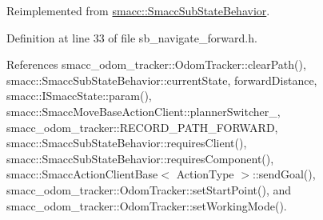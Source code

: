 Reimplemented from \hyperlink{classsmacc_1_1SmaccSubStateBehavior_a7c28e1c46238bbb2c2e0450573c6de94}{smacc\+::\+Smacc\+Sub\+State\+Behavior}.



Definition at line 33 of file sb\+\_\+navigate\+\_\+forward.\+h.



References smacc\+\_\+odom\+\_\+tracker\+::\+Odom\+Tracker\+::clear\+Path(), smacc\+::\+Smacc\+Sub\+State\+Behavior\+::current\+State, forward\+Distance, smacc\+::\+I\+Smacc\+State\+::param(), smacc\+::\+Smacc\+Move\+Base\+Action\+Client\+::planner\+Switcher\+\_\+, smacc\+\_\+odom\+\_\+tracker\+::\+R\+E\+C\+O\+R\+D\+\_\+\+P\+A\+T\+H\+\_\+\+F\+O\+R\+W\+A\+RD, smacc\+::\+Smacc\+Sub\+State\+Behavior\+::requires\+Client(), smacc\+::\+Smacc\+Sub\+State\+Behavior\+::requires\+Component(), smacc\+::\+Smacc\+Action\+Client\+Base$<$ Action\+Type $>$\+::send\+Goal(), smacc\+\_\+odom\+\_\+tracker\+::\+Odom\+Tracker\+::set\+Start\+Point(), and smacc\+\_\+odom\+\_\+tracker\+::\+Odom\+Tracker\+::set\+Working\+Mode().


